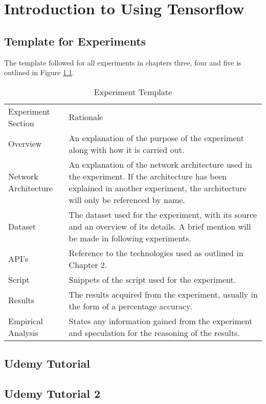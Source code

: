 \chapter{Introduction to Using Tensorflow}
\section{Template for Experiments}
The template followed for all experiments in chapters three, four and five is outlined in Figure \ref{fig:expTemplate}.

\begin{table}[]
\centering
\caption{Experiment Template}
\label{fig:expTemplate}
\begin{tabular}{ll}
Experiment Section   & Rationale                \\
Overview             & An explanation of the purpose of the experiment along with how it is carried out. \\
Network Architecture & An explanation of the network architecture used in the experiment. If the architecture has been explained in another experiment, the architecture will only be referenced by name.                       \\
Dataset              & The dataset used for the experiment, with its source and an overview of its details. A brief mention will be made in following experiments.                       \\
API's                & Reference to the technologies used as outlined in Chapter 2.                      \\
Script               & Snippets of the script used for the experiment.                       \\
Results              & The results acquired from the experiment, usually in the form of a percentage accuracy.                       \\
Empirical Analysis   & States any information gained from the experiment and speculation for the reasoning of the results.                      
\end{tabular}
\end{table}

\section{Udemy Tutorial}


\section{Udemy Tutorial 2}


